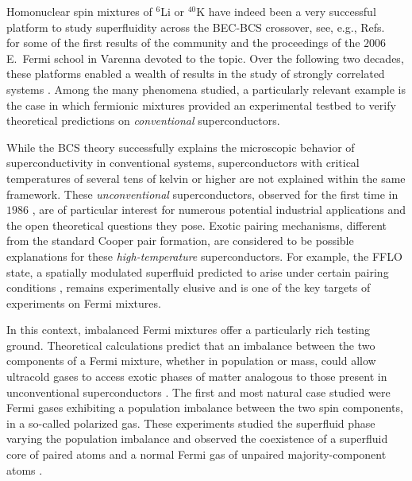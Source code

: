 Homonuclear spin mixtures of $^6$Li or $^{40}$K have indeed been a very successful  platform to study superfluidity across the \ac{BEC}-\ac{BCS} crossover, see, e.g., Refs.~\cite{Jochim2003bec, Bartenstein2004cfa, Zwierlein2003oob, Zwierlein2004cop, Zwierlein2005vas, Greiner2003eoa, Regal2004oor} for some of the first results of the community and the proceedings of the $2006$ E.~Fermi school in Varenna \cite{Varenna2006book} devoted to the topic. Over the following two decades, these platforms enabled a wealth of results in the study of strongly correlated systems \cite{Sidorenkov2013ssa, Kwon2021sea, Buehler2026moc, Yan2024tot}. Among the many phenomena studied, a particularly relevant example is the case in which fermionic mixtures provided an experimental testbed to verify theoretical predictions on  \textit{conventional} superconductors.

While the \ac{BCS} theory successfully explains the microscopic behavior of superconductivity in conventional systems, superconductors with critical temperatures of several tens of kelvin or higher are not explained within the same framework. These  \textit{unconventional} superconductors, observed for the first time in $1986$ \cite{Bednorz1986pht}, are of particular interest for numerous potential industrial applications and the open theoretical questions they pose. Exotic pairing mechanisms, different from the standard Cooper pair formation, are considered to be possible explanations for these \textit{high-temperature} superconductors. For example, the \ac{FFLO} state, a spatially modulated superfluid predicted to arise under certain pairing conditions \cite{Fulde1964sia, Larkin1964nss}, remains experimentally elusive and is one of the key targets of experiments on Fermi mixtures.

In this context, imbalanced Fermi mixtures offer a particularly rich testing ground. Theoretical calculations predict that an imbalance between the two components of a Fermi mixture, whether in population or mass, could allow ultracold gases to access exotic phases of matter analogous to those present in unconventional superconductors \cite{Pao2007afs, Baarsma2010pam}. The first and most natural case studied were Fermi gases exhibiting a population imbalance between the two spin components, in a so-called polarized gas. These experiments studied the superfluid phase varying the population imbalance and observed the coexistence of a superfluid core of paired atoms and a normal Fermi gas of unpaired majority-component atoms \cite{Zwierlein2006fsw,Shin2008pdo}.

